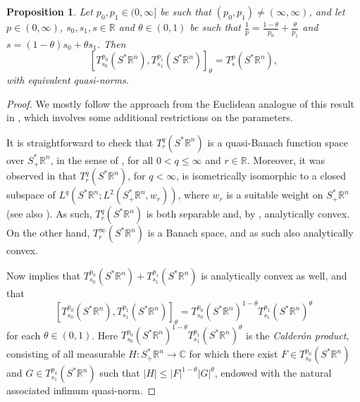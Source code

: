 \documentclass{amsart}
\newcommand {\C}{{\mathbb C}}
\newcommand {\R}{\mathbb R}
\newcommand {\Rn}{\mathbb{R}^{n}}
\newcommand {\Sp}{S^{*}\Rn}
\newcommand {\Spp}{S^{*}_{+}\Rn}
\newtheorem{proposition}[theorem]{Proposition}
\theoremstyle{definition}
\numberwithin{equation}{section}
\begin{document}
\begin{proposition}\label{prop:tentintapp}
Let $p_{0},p_{1}\in(0,\infty]$ be such that $(p_{0},p_{1})\neq (\infty,\infty)$, and let $p\in(0,\infty)$, $s_{0},s_{1},s\in\R$ and $\theta\in(0,1)$ be such that $\frac{1}{p}=\frac{1-\theta}{p_{0}}+\frac{\theta}{p_{1}}$ and $s=(1-\theta)s_{0}+\theta s_{1}$. Then
\[
[T^{p_{0}}_{s_{0}}(\Sp),T^{p_{1}}_{s_{1}}(\Sp)]_{\theta}=T^{p}_{s}(\Sp),
\]
with equivalent quasi-norms.
\end{proposition}
\begin{proof}

We mostly follow the approach from the Euclidean analogue of this result in \cite[Lemma 8.23]{HoMaMc11}, which involves some additional restrictions on the parameters. 

It is straightforward to check that $T^{q}_{r}(\Sp)$ is a quasi-Banach function space over $\Spp$, in the sense of \cite[Section 3]{Egert-Kosmala24}, for all $0<q\leq\infty$ and $r\in\R$. Moreover, it was observed in \cite{HaToVi91} that $T^{q}_{r}(\Sp)$, for $q<\infty$, is isometrically isomorphic to a closed subspace of $L^{q}(\Sp;L^{2}(\Spp,w_{r}))$, where $w_{r}$ is a suitable weight on $\Spp$ (see also \cite[page 120]{Amenta18}). As such, $T^{q}_{r}(\Sp)$ is both separable and, by \cite[Proposition 7.5 and Lemma 7.6]{KaMaMi07}, analytically convex. On the other hand, $T^{\infty}_{r}(\Sp)$ is a Banach space, and as such also analytically convex.

Now \cite[Theorem 1]{Egert-Kosmala24} implies that  $T^{p_{0}}_{s_{0}}(\Sp)+T^{p_{1}}_{s_{1}}(\Sp)$ is analytically convex as well, and that
\begin{equation}\label{eq:Calderon}
[T^{p_{0}}_{s_{0}}(\Sp),T^{p_{1}}_{s_{1}}(\Sp)]_{\theta}=T^{p_{0}}_{s_{0}}(\Sp)^{1-\theta}T^{p_{1}}_{s_{1}}(\Sp)^{\theta}
\end{equation}
for each $\theta\in(0,1)$. Here  $T^{p_{0}}_{s_{0}}(\Sp)^{1-\theta}T^{p_{1}}_{s_{1}}(\Sp)^{\theta}$ is the \emph{Calder\'{o}n product}, consisting of all measurable $H:\Spp\to\C$ for which there exist $F\in T^{p_{0}}_{s_{0}}(\Sp)$ and  $G\in T^{p_{1}}_{s_{1}}(\Sp)$ such that $|H|\leq |F|^{1-\theta}|G|^{\theta}$, endowed with the natural associated infimum quasi-norm. 


\end{proof}
\end{document}

